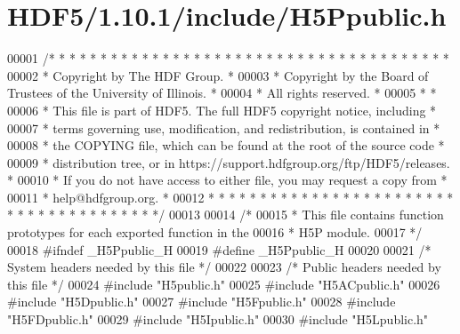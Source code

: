 \hypertarget{_h_d_f5_21_810_81_2include_2_h5_ppublic_8h_source}{}\section{H\+D\+F5/1.10.1/include/\+H5\+Ppublic.h}
\label{_h_d_f5_21_810_81_2include_2_h5_ppublic_8h_source}

\begin{DoxyCode}
00001 \textcolor{comment}{/* * * * * * * * * * * * * * * * * * * * * * * * * * * * * * * * * * * * * * *}
00002 \textcolor{comment}{ * Copyright by The HDF Group.                                               *}
00003 \textcolor{comment}{ * Copyright by the Board of Trustees of the University of Illinois.         *}
00004 \textcolor{comment}{ * All rights reserved.                                                      *}
00005 \textcolor{comment}{ *                                                                           *}
00006 \textcolor{comment}{ * This file is part of HDF5.  The full HDF5 copyright notice, including     *}
00007 \textcolor{comment}{ * terms governing use, modification, and redistribution, is contained in    *}
00008 \textcolor{comment}{ * the COPYING file, which can be found at the root of the source code       *}
00009 \textcolor{comment}{ * distribution tree, or in https://support.hdfgroup.org/ftp/HDF5/releases.  *}
00010 \textcolor{comment}{ * If you do not have access to either file, you may request a copy from     *}
00011 \textcolor{comment}{ * help@hdfgroup.org.                                                        *}
00012 \textcolor{comment}{ * * * * * * * * * * * * * * * * * * * * * * * * * * * * * * * * * * * * * * */}
00013 
00014 \textcolor{comment}{/*}
00015 \textcolor{comment}{ * This file contains function prototypes for each exported function in the}
00016 \textcolor{comment}{ * H5P module.}
00017 \textcolor{comment}{ */}
00018 \textcolor{preprocessor}{#ifndef \_H5Ppublic\_H}
00019 \textcolor{preprocessor}{#define \_H5Ppublic\_H}
00020 
00021 \textcolor{comment}{/* System headers needed by this file */}
00022 
00023 \textcolor{comment}{/* Public headers needed by this file */}
00024 \textcolor{preprocessor}{#include "H5public.h"}
00025 \textcolor{preprocessor}{#include "H5ACpublic.h"}
00026 \textcolor{preprocessor}{#include "H5Dpublic.h"}
00027 \textcolor{preprocessor}{#include "H5Fpublic.h"}
00028 \textcolor{preprocessor}{#include "H5FDpublic.h"}
00029 \textcolor{preprocessor}{#include "H5Ipublic.h"}
00030 \textcolor{preprocessor}{#include "H5Lpublic.h"}

\end{DoxyCode}
